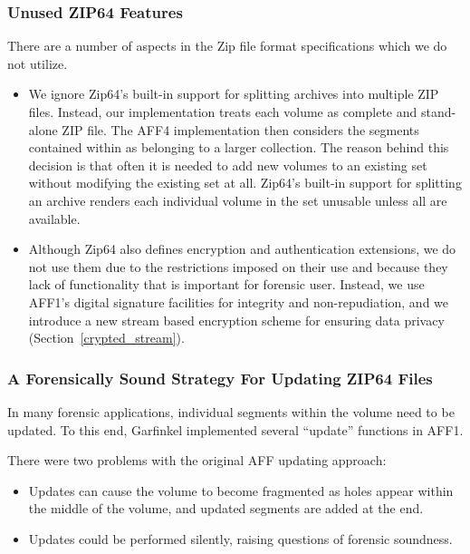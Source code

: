 \documentclass[10pt, conference]{IEEEtran}
\begin{document}
\subsubsection{Unused ZIP64 Features}

There are a number of aspects in the Zip file format specifications
which we do not utilize. 
\begin{itemize}
\item We ignore Zip64's built-in support for splitting
archives into multiple ZIP files. Instead, our implementation treats
each volume as complete and stand-alone ZIP file. The AFF4
implementation then considers the segments contained within as 
belonging to a larger collection. The reason behind this decision is that
often it is needed to add new volumes to an existing set without
modifying the existing set at all. Zip64's built-in support for
splitting an archive renders each individual volume in the set
unusable unless all are available. 

\item Although Zip64 also defines encryption and authentication
extensions, we do not use them due to the
restrictions imposed on their use and because they lack of functionality that is
important for forensic user. Instead, we use AFF1's digital signature
facilities for integrity and non-repudiation, and we introduce a new  stream based
encryption scheme for ensuring data privacy (Section~\ref{crypted_stream}).

\end{itemize}

\subsubsection{A Forensically Sound Strategy For Updating ZIP64 Files}

In many forensic applications, individual segments within the volume
need to be updated. To this end, Garfinkel implemented several
``update'' functions in AFF1\cite{garfinkel:aff}. 

There were two problems with the original AFF updating approach:
\begin{itemize}
\item Updates can cause the volume to
become fragmented as holes appear within the middle of the volume, and
updated segments are added at the end.
\item Updates could be performed silently, raising questions of
  forensic soundness.
\end{itemize}
\end{document}
